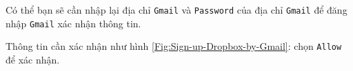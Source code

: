 \begin{list}{--}{}
\item Có thể bạn sẽ cần nhập lại địa chỉ \verb|Gmail| và \verb|Password| của địa chỉ \verb|Gmail| để đăng nhập \verb|Gmail| xác nhận thông tin.
\item Thông tin cần xác nhận như hình \ref{Fig:Sign-up-Dropbox-by-Gmail}: chọn \verb|Allow| để xác nhận.
\begin{figure}[!h]
\begin{center}
 \hspace{.5cm}

\end{center}
\end{figure}
\end{list}
